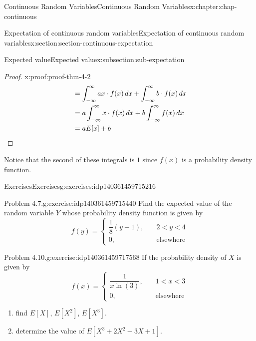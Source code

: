 \documentclass[oneside,10pt,]{book}
\newcommand{\qedhere}{\relax}
\numberwithin{equation}{section}
\newcommand{\lt}{<}
\newcommand{\amp}{&}
\begin{document}
\begin{chapterptx}{Continuous Random Variables}{}{Continuous Random Variables}{}{}{x:chapter:chap-continuous}
\begin{sectionptx}{Expectation of continuous random variables}{}{Expectation of continuous random variables}{}{}{x:section:section-continuous-expectation}
\begin{subsectionptx}{Expected value}{}{Expected value}{}{}{x:subsection:sub-expectation}
\begin{proof}{}{x:proof:proof-thm-4-2}
\begin{equation*}
\begin{aligned}[t]
\amp = \int_{-\infty}^\infty ax\cdot f(x)\,dx + \int_{-\infty}^\infty
b\cdot f(x)\,dx\\
\amp = a\int_{-\infty}^\infty x\cdot f(x)\,dx + b\int_{-\infty}^\infty
f(x)\,dx\\
\amp = aE[x] + b
\end{aligned}\qedhere
\end{equation*}
\end{proof}
 Notice that the second of these integrals is \(1\) since \(f(x)\) is a probability density function.%
\end{subsectionptx}
%
%
\typeout{************************************************}
\typeout{************************************************}
%
\begin{exercises-subsection}{Exercises}{}{Exercises}{}{}{g:exercises:idp140361459715216}
\begin{divisionexercise}{1}{Problem 4.7.}{}{g:exercise:idp140361459715440}%
Find the expected value of the random variable \(Y\) whose probability density function is given by%
\begin{equation*}
f(y) = \begin{cases}
\dfrac{1}{8}(y+1), \amp \quad 2 \lt y \lt 4\\
0, \amp \quad \text{elsewhere}\end{cases}
\end{equation*}
%
\end{divisionexercise}%
\begin{divisionexercise}{2}{Problem 4.10.}{}{g:exercise:idp140361459717568}%
If the probability density of \(X\) is given by%
\begin{equation*}
f(x) =
\begin{cases} \dfrac{1}{x\ln(3)}, \amp \quad 1 \lt x \lt 3\\
0, \amp \quad \text{elsewhere}\end{cases}
\end{equation*}
%
\begin{enumerate}[label=(\alph*)]
\item{}find \(E[X]\), \(E[X^2]\), \(E[X^3]\).%
\item{}determine the value of \(E[X^3 + 2X^2-3X+1]\).%
\end{enumerate}
%
\end{divisionexercise}%
\end{exercises-subsection}
%
%
\typeout{************************************************}
\typeout{************************************************}

\end{sectionptx}
\end{chapterptx}
\end{document}
